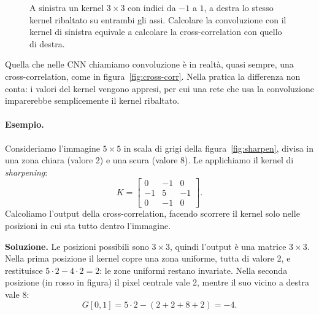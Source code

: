 \begin{figure}[htbp]
\centering
{}
\caption{A sinistra un kernel $3 \times 3$ con indici da $-1$ a $1$, a destra lo stesso kernel ribaltato su entrambi gli assi. Calcolare la convoluzione con il kernel di sinistra equivale a calcolare la cross-correlation con quello di destra.}
\label{fig:flip}
\end{figure}

\begin{osservazione}
Quella che nelle CNN chiamiamo convoluzione è in realtà, quasi sempre, una cross-correlation, come in figura~\ref{fig:cross-corr}. Nella pratica la differenza non conta: i valori del kernel vengono appresi, per cui una rete che usa la convoluzione imparerebbe semplicemente il kernel ribaltato.
\end{osservazione}

\paragraph{Esempio.}
Consideriamo l'immagine $5 \times 5$ in scala di grigi della figura~\ref{fig:sharpen}, divisa in una zona chiara (valore 2) e una scura (valore 8). Le applichiamo il kernel di \emph{sharpening}:
\[
K = \begin{bmatrix} 0 & -1 & 0 \\ -1 & 5 & -1 \\ 0 & -1 & 0 \end{bmatrix}.
\]
Calcoliamo l'output della cross-correlation, facendo scorrere il kernel solo nelle posizioni in cui sta tutto dentro l'immagine.

\textbf{Soluzione.} Le posizioni possibili sono $3 \times 3$, quindi l'output è una matrice $3 \times 3$. Nella prima posizione il kernel copre una zona uniforme, tutta di valore 2, e restituisce $5 \cdot 2 - 4 \cdot 2 = 2$: le zone uniformi restano invariate. Nella seconda posizione (in rosso in figura) il pixel centrale vale 2, mentre il suo vicino a destra vale 8:
\[
G[0, 1] = 5 \cdot 2 - (2 + 2 + 8 + 2) = -4.
\]

